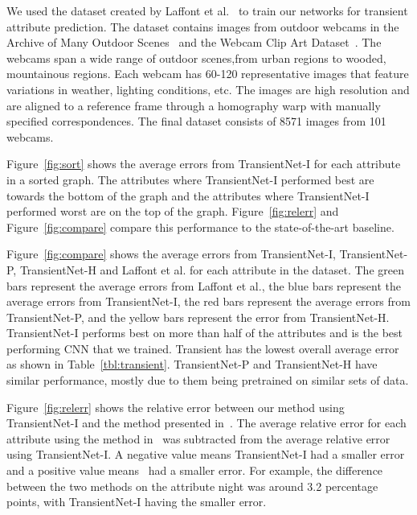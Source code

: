 \documentclass{article}
\newcommand{\figref}[1]{Figure~\ref{fig:#1}}
\newcommand{\tblref}[1]{Table~\ref{tbl:#1}}
\begin{document}
We used the dataset created by Laffont et al.~\cite{Laffont14} to
train our networks for transient attribute prediction. The dataset
contains images from outdoor webcams in the Archive of Many Outdoor
Scenes~\cite{jacobs07amos} and the Webcam Clip Art
Dataset~\cite{lalondesig09}.  The webcams span a wide range of outdoor
scenes,from urban regions to wooded, mountainous regions. Each webcam
has 60-120 representative images that feature variations in weather,
lighting conditions, etc.  The images are high resolution and are
aligned to a reference frame through a homography warp with manually
specified correspondences.  The final dataset consists of 8571 images
from 101 webcams.

\figref{sort} shows the average errors from TransientNet-I for each attribute
in a sorted graph.  The attributes where TransientNet-I performed best are towards
the bottom of the graph and the attributes where TransientNet-I performed
worst are on the top of the graph. \figref{relerr} and \figref{compare} 
compare this performance to the state-of-the-art baseline.

\figref{compare} shows the average errors from TransientNet-I, TransientNet-P, 
TransientNet-H and Laffont et al. for each attribute in the dataset.  The green bars 
represent the average errors from Laffont et al., the blue bars represent the average 
errors from TransientNet-I, the red bars represent the average errors from TransientNet-P, 
and the yellow bars represent the error from TransientNet-H. TransientNet-I performs best on 
more than half of the attributes and is the best performing CNN that we trained.  
Transient has the lowest overall average error as shown in \tblref{transient}.  TransientNet-P
and TransientNet-H have similar performance, mostly due to them being pretrained on similar 
sets of data.

\figref{relerr} shows the relative error between our method using TransientNet-I
and the method presented in~\cite{Laffont14}.  The average relative error 
for each attribute using the method in~\cite{Laffont14} was subtracted from
the average relative error using TransientNet-I.  A negative value means TransientNet-I
had a smaller error and a positive value means~\cite{Laffont14} had a smaller
error.  For example, the difference between the two methods on the attribute
night was around 3.2 percentage points, with TransientNet-I having the smaller 
error.

 
%
%
%
\end{document}
